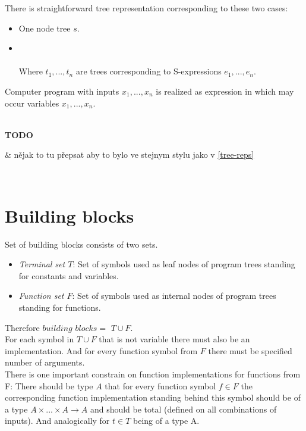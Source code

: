 \documentclass[12pt,a4paper]{report}
\newenvironment{todo}
{ ~\\[0.5em]
  {\color{red}\textbf{TODO}}
  \begin{easylist}[itemize]}
{ \end{easylist}
  ~}
\begin{document}
There is straightforward tree representation corresponding to these two cases:

\begin{itemize}
	\item One node tree $s$.
    \item {}\\\\
		 Where $t_{1}, ..., t_{n}$ are trees corresponding 
		 to S-expressions $e_{1}, ..., e_{n}$.	   
\end{itemize}

Computer program with inputs $x_{1}, ..., x_{n}$ is realized as expression in which 
may occur variables $x_{1}, ..., x_{n}$.

\begin{todo}
 & nějak to tu přepsat aby to bylo ve stejnym stylu jako v \ref{tree-reps}
\end{todo}


\section{Building blocks}
\label{building-blocks}

Set of building blocks consists of two sets.

\begin{itemize}
	\item \textit{Terminal set $T$}: Set of symbols used as leaf nodes of 	               
	      program trees standing for constants and variables.
	\item \textit{Function set $F$}: Set of symbols used as internal nodes 
	      of program trees standing for functions.
\end{itemize}

\newcommand{\TuF}{$T \cup F$\xspace}

Therefore $building$ $blocks = $ \TuF.\\

For each symbol in \TuF that is not variable 
there must also be an implementation.
And for every function symbol from $F$ there must be specified 
number of arguments.\\

There is one important constrain on function implementations for functions from F:
There should be type $A$ that for every function symbol $f \in F$ the corresponding function implementation standing behind this symbol should be of a type 
$A \times ... \times A \rightarrow A$ and should be total (defined on all
combinations of inputs). And analogically for $t \in T$ being of a type A.  
\end{document}
